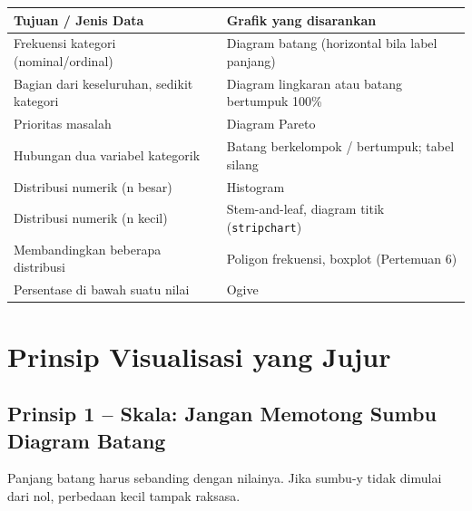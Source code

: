 \documentclass[
  indonesian,
  letterpaper,
]{book}
\newcounter{none} %
\begin{document}
{\def\LTcaptype{none} %
\begin{longtable}[]{@{}
  >{\raggedright\arraybackslash}p{}
  >{\raggedright\arraybackslash}p{}@{}}
\toprule\noalign{}
\begin{minipage}[b]{\linewidth}\raggedright
Tujuan / Jenis Data
\end{minipage} & \begin{minipage}[b]{\linewidth}\raggedright
Grafik yang disarankan
\end{minipage} \\
\midrule\noalign{}
\endhead
\bottomrule\noalign{}
\endlastfoot
Frekuensi kategori (nominal/ordinal) & Diagram batang (horizontal bila
label panjang) \\
Bagian dari keseluruhan, sedikit kategori & Diagram lingkaran atau
batang bertumpuk 100\% \\
Prioritas masalah & Diagram Pareto \\
Hubungan dua variabel kategorik & Batang berkelompok / bertumpuk; tabel
silang \\
Distribusi numerik (n besar) & Histogram \\
Distribusi numerik (n kecil) & Stem-and-leaf, diagram titik
(\texttt{stripchart}) \\
Membandingkan beberapa distribusi & Poligon frekuensi, boxplot
(Pertemuan 6) \\
Persentase di bawah suatu nilai & Ogive \\
\end{longtable}
}

\section{Prinsip Visualisasi yang
Jujur}\label{prinsip-visualisasi-yang-jujur}

\subsection{Prinsip 1 -- Skala: Jangan Memotong Sumbu Diagram
Batang}\label{prinsip-1-skala-jangan-memotong-sumbu-diagram-batang}

Panjang batang harus sebanding dengan nilainya. Jika sumbu-y tidak
dimulai dari nol, perbedaan kecil tampak raksasa.
\end{document}
